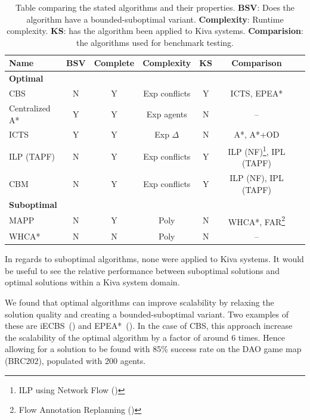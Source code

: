 \documentclass[a4paper,11pt]{article}
\begin{document}
\begin{table}[ht]
	\centering
	\small
	\begin{tabular}{ l c c c c c p{2.3cm}}
		
		\textbf{Name} & \textbf{BSV} & \textbf{Complete} & \textbf{Complexity} & \textbf{KS} & \textbf{Comparison} \\
		\hline
		\multicolumn{6}{l}{\textbf{Optimal}} \\
		\hline
		CBS 				& N & Y & Exp conflicts & Y & ICTS, EPEA* \\
		Centralized A* 		& Y & Y & Exp agents & N & -- \\
		ICTS 				& Y & Y & Exp $\Delta$ & N & A*, A*+OD \\
		ILP	(TAPF)			& N & Y & Exp conflicts & Y & ILP (NF)\footnote{ILP using Network Flow (\cite{yu2013multi})}, IPL (TAPF) \\
		CBM 				& N & Y & Exp conflicts & Y & ILP (NF), IPL (TAPF) \\
		\hline
		\multicolumn{6}{l}{\textbf{Suboptimal}} \\
		\hline
		MAPP 				& N & Y & Poly & N & WHCA*, FAR\footnote{Flow Annotation Replanning (\cite{wang2008fast})} \\
		WHCA* 				& N & N & Poly & N & -- \\
	\end{tabular}

	\caption{Table comparing the stated algorithms and their properties. \textbf{BSV}: Does the algorithm have a bounded-suboptimal variant. \textbf{Complexity}: Runtime complexity. \textbf{KS}: has the algorithm been applied to Kiva systems. \textbf{Comparision}: the algorithms used for benchmark testing.}
	\label{table:comparison}
\end{table}

In regards to suboptimal algorithms, none were applied to Kiva systems. It would be useful to see the relative performance between suboptimal solutions and optimal solutions within a Kiva system domain.

We found that optimal algorithms can improve scalability by relaxing the solution quality and creating a bounded-suboptimal variant. Two examples of these are iECBS~(\cite{cohen2016improved}) and EPEA*~(\cite{goldenberg2014enhanced}). In the case of CBS, this approach increase the scalability of the optimal algorithm by a factor of around 6 times. Hence allowing for a solution to be found with 85\% success rate on the DAO game map (BRC202), populated with 200 agents.
\end{document}

